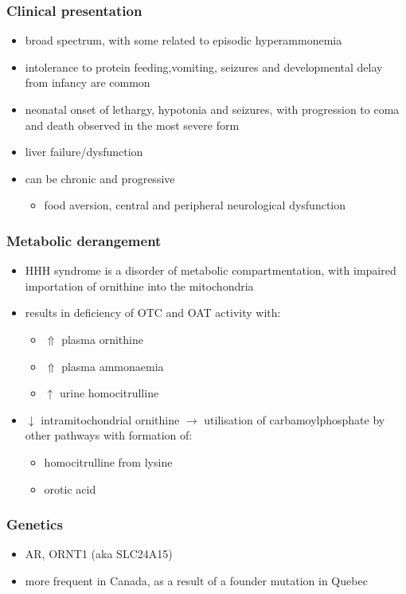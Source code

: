 \documentclass{scrartcl}
\begin{document}
\subsubsection{Clinical presentation}
\label{sec:org0ea58df}
\begin{itemize}
\item broad spectrum, with some related to episodic hyperammonemia
\item intolerance to protein feeding,vomiting, seizures and developmental
delay from infancy are common
\item neonatal onset of lethargy, hypotonia and seizures, with progression
to coma and death observed in the most severe form
\item liver failure/dysfunction
\item can be chronic and progressive
\begin{itemize}
\item food aversion, central and peripheral neurological dysfunction
\end{itemize}
\end{itemize}

\subsubsection{Metabolic derangement}
\label{sec:org3506f33}
\begin{itemize}
\item HHH syndrome is a disorder of metabolic compartmentation, with
impaired importation of ornithine into the mitochondria
\item results in deficiency of OTC and OAT activity with:
\begin{itemize}
\item \(\Uparrow\) plasma ornithine
\item \(\Uparrow\) plasma ammonaemia
\item \(\uparrow\) urine homocitrulline
\end{itemize}
\item \(\downarrow\) intramitochondrial ornithine \(\to\) utilisation of
carbamoylphosphate by other pathways with formation of:
\begin{itemize}
\item homocitrulline from lysine
\item orotic acid
\end{itemize}
\end{itemize}
\subsubsection{Genetics}
\label{sec:orgd93d24f}
\begin{itemize}
\item AR, ORNT1 (aka SLC24A15)
\item more frequent in Canada, as a result of a founder mutation in Quebec
\end{itemize}
\end{document}
